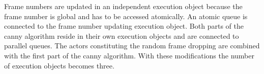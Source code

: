 \documentclass[a4paper,10pt]{article}
\begin{document}
Frame numbers are updated in an independent execution object because the frame number is global and has to be accessed atomically. An atomic queue is connected to the frame number updating execution object. Both parts of the canny algorithm reside in their own execution objects and are connected to parallel queues. The actors constituting the random frame dropping are combined with the first part of the canny algorithm. With these modifications the number of execution objects becomes three.




\end{document}
